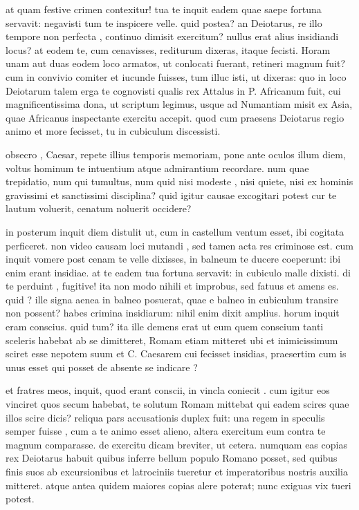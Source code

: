  at quam festive crimen contexitur! tua te inquit eadem quae saepe fortuna servavit: negavisti tum te inspicere velle. quid postea? an Deiotarus, re illo tempore non perfecta , continuo dimisit exercitum? nullus erat alius insidiandi locus? at eodem te, cum cenavisses, rediturum dixeras, itaque fecisti. Horam unam aut duas eodem loco armatos, ut conlocati fuerant, retineri magnum fuit? cum in convivio comiter et iucunde fuisses, tum illuc isti, ut dixeras: quo in loco Deiotarum talem erga te cognovisti qualis rex Attalus in P. Africanum fuit, cui magnificentissima dona, ut scriptum legimus, usque ad Numantiam misit ex Asia, quae Africanus inspectante exercitu accepit. quod cum praesens Deiotarus regio animo et more fecisset, tu in cubiculum discessisti.

 obsecro , Caesar, repete illius temporis memoriam, pone ante oculos illum diem, voltus hominum te intuentium atque admirantium recordare. num quae trepidatio, num qui tumultus, num quid nisi modeste , nisi quiete, nisi ex hominis gravissimi et sanctissimi disciplina? quid igitur causae excogitari potest cur te lautum voluerit, cenatum noluerit occidere?

 in posterum inquit diem distulit ut, cum in castellum ventum esset, ibi cogitata perficeret. non video causam loci mutandi , sed tamen acta res criminose est. cum inquit vomere post cenam te velle dixisses, in balneum te ducere coeperunt: ibi enim erant insidiae. at te eadem tua fortuna servavit: in cubiculo malle dixisti. di te perduint , fugitive! ita non modo nihili et improbus, sed fatuus et amens es. quid ? ille signa aenea in balneo posuerat, quae e balneo in cubiculum transire non possent? habes crimina insidiarum: nihil enim dixit amplius. horum inquit eram conscius. quid tum? ita ille demens erat ut eum quem conscium tanti sceleris habebat ab se dimitteret, Romam etiam mitteret ubi et inimicissimum sciret esse nepotem suum et C. Caesarem cui fecisset insidias, praesertim cum is unus esset qui posset de absente se indicare ?

 et fratres meos, inquit, quod erant conscii, in vincla coniecit . cum igitur eos vinciret quos secum habebat, te solutum Romam mittebat qui eadem scires quae illos scire dicis? reliqua pars accusationis duplex fuit: una regem in speculis semper fuisse , cum a te animo esset alieno, altera exercitum eum contra te magnum comparasse. de exercitu dicam breviter, ut cetera. numquam eas copias rex Deiotarus habuit quibus inferre bellum populo Romano posset, sed quibus finis suos ab excursionibus et latrociniis tueretur et imperatoribus nostris auxilia mitteret. atque antea quidem maiores copias alere poterat; nunc exiguas vix tueri potest.

